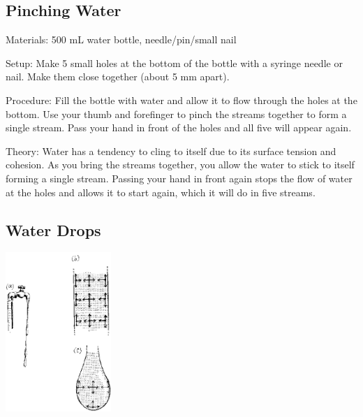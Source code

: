 \begin{multicols}{2}
\subsection{Pinching Water}
\begin{description*}
\item[Materials:]{500 mL water bottle, needle/pin/small nail}
\item[Setup:]{Make 5 small holes at the bottom of the bottle with a syringe needle or nail. Make them close together (about 5 mm apart).}
\item[Procedure:]{Fill the bottle with water and allow it to flow through the holes at the bottom. Use your thumb and forefinger to pinch the streams together to form a single stream. Pass your hand in front of the holes and all five will appear again.}
\item[Theory:]{Water has a tendency to cling to itself due to its surface tension and cohesion. As you bring the streams together, you allow the water to stick to itself forming a single stream. Passing your hand in front again stops the flow of water at the holes and allows it to start again, which it will do in five streams.}
\end{description*}

\subsection{Water Drops}

\begin{center}
\includegraphics[width=0.3\textwidth]{./img/source/water-drops.png}
\end{center}


\end{multicols}
